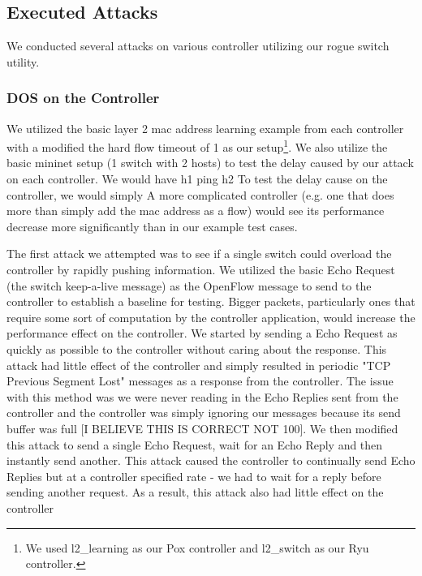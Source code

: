 \subsection{Executed Attacks} We conducted several attacks on various controller utilizing our rogue switch utility. 

 \subsubsection{DOS on the Controller}
We utilized the basic layer 2 mac address learning example from each controller with a modified the hard flow timeout of 1 as our setup\footnote{We used l2\_learning as our Pox controller and l2\_switch as our Ryu controller.}. We also utilize the basic mininet setup (1 switch with 2 hosts) to test the delay caused by our attack on each controller. We would have h1 ping h2 To test the delay cause on the controller, we would simply A more complicated controller (e.g. one that does more than simply add the mac address as a flow) would see its performance decrease more significantly than in our example test cases.

 The first attack we attempted was to see if a single switch could overload the controller by rapidly pushing information. We utilized the basic Echo Request (the switch keep-a-live message) as the OpenFlow message to send to the controller to establish a baseline for testing. Bigger packets, particularly ones that require some sort of computation by the controller application, would increase the performance effect on the controller. We started by sending a Echo Request as quickly as possible to the controller without caring about the response. This attack had little effect of the controller and simply resulted in periodic "TCP Previous Segment Lost" messages as a response from the controller. The issue with this method was we were never reading in the Echo Replies sent from the controller and the controller was simply ignoring our messages because its send buffer was full [I BELIEVE THIS IS CORRECT NOT 100]. We then modified this attack to send a single Echo Request, wait for an Echo Reply and then instantly send another. This attack caused the controller to continually send Echo Replies but at a controller specified rate - we had to wait for a reply before sending another request. As a result, this attack also had little effect on the controller

